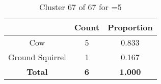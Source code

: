 \begin{table}[ht!]
\centering
\begin{tabular}{|c|c|c|}
\hline
\bf \Spec{} &\bf Count &\bf Proportion\\ \hline \hline
Cow & 5 & 0.833\\ \hline
Ground Squirrel & 1 & 0.167\\ \hline
\hline
\bf Total & \bf 6 & \bf 1.000\\ \hline
\end{tabular}
\label{tab:cluster:67:5}
\caption{Cluster 67 of 67 for \minneigh{}=5}
\end{table}

